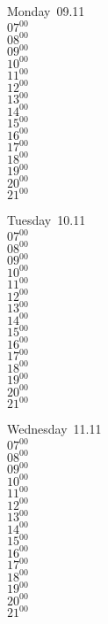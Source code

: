 \documentclass[11pt,a4paper]{book}\usepackage[]{graphicx}\usepackage[]{color}
\begin{document}
\begin{headerbox}
\end{headerbox}
\begin{weekdaybox}
  Monday~09.11\\
  { 
  \vfill
  $07^{00}$\\
$08^{00}$\\
$09^{00}$\\
$10^{00}$\\
$11^{00}$\\
$12^{00}$\\
$13^{00}$\\
$14^{00}$\\
$15^{00}$\\
$16^{00}$\\
$17^{00}$\\
$18^{00}$\\
$19^{00}$\\
$20^{00}$\\
$21^{00}$\\
  }
\end{weekdaybox}
\begin{weekdaybox}
  Tuesday~10.11\\
  { 
  \vfill
  $07^{00}$\\
$08^{00}$\\
$09^{00}$\\
$10^{00}$\\
$11^{00}$\\
$12^{00}$\\
$13^{00}$\\
$14^{00}$\\
$15^{00}$\\
$16^{00}$\\
$17^{00}$\\
$18^{00}$\\
$19^{00}$\\
$20^{00}$\\
$21^{00}$\\
  }
\end{weekdaybox}
\begin{weekdaybox}
  Wednesday~11.11\\
  { 
  \vfill
  $07^{00}$\\
$08^{00}$\\
$09^{00}$\\
$10^{00}$\\
$11^{00}$\\
$12^{00}$\\
$13^{00}$\\
$14^{00}$\\
$15^{00}$\\
$16^{00}$\\
$17^{00}$\\
$18^{00}$\\
$19^{00}$\\
$20^{00}$\\
$21^{00}$\\
  }
\end{weekdaybox}
\end{document}
